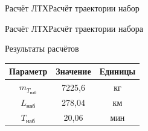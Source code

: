 \begin{frame}{Расчёт ЛТХ}{Расчёт траектории набор}
    \begin{minipage}[c]{0.45\textwidth}
    \end{minipage}
    \begin{minipage}[c]{0.45\textwidth}
    \end{minipage}
\end{frame}
 
\begin{frame}{Расчёт ЛТХ}{Расчёт траектории набора}
    \begin{block}{Результаты расчётов}
    \begin{table}
        \begin{tabular}{|c|c|c|}
            \hline
            Параметр&  Значение & Единицы  \\ \hline
            $m_{T_{\text{наб}}}$& 7225,6 &кг \\ \hline
            $L_\text{наб}$& 278,04 &км \\ \hline
            $T_\text{наб}$& 20,06 & мин\\ \hline
        \end{tabular}
    \end{table}
    \end{block}
\end{frame}


